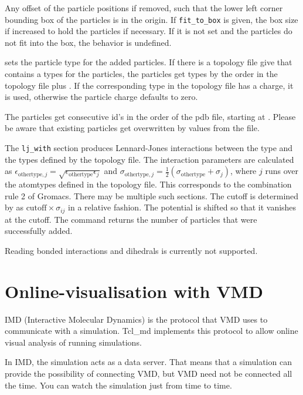 Any offset of the particle positions if removed, such that the lower left
corner bounding box of the particles is in the origin. If \verb|fit_to_box| is
given, the box size if increased to hold the particles if necessary. If it is
not set and the particles do not fit into the box, the behavior is undefined.

 sets the particle type for the added particles. 
If there is a topology file give that contains a types for the particles, 
the particles get types by the order in the topology file plus .
If the corresponding type in the topology file has a charge, it is used,
otherwise the particle charge defaults to zero.

The particles get consecutive id's in the order of the pdb file, starting at
. Please be aware that existing particles get overwritten by
values from the file.

The \verb|lj_with| section produces Lennard-Jones interactions between the
type  and the types defined by the topology file. The
interaction parameters are calculated as $\epsilon_{\text{othertype},j} =
\sqrt{\epsilon_{\text{othertype}} \epsilon_j}$ and $\sigma_{\text{othertype},j}
=\frac{1}{2}\left( \sigma_{\text{othertype}} + \sigma_j \right)$, where $j$
runs over the atomtypes defined in the topology file. This corresponds to the
combination rule 2 of Gromacs. There may be multiple such sections.
The cutoff is determined by  as $\text{cutoff}\times \sigma_{ij}$ in a
relative fashion. The potential is shifted so that it vanishes at the cutoff.
The command returns the number of particles that were successfully added.

Reading bonded interactions and dihedrals is currently not supported.

\section{Online-visualisation with VMD}
\label{sec:IMD}

IMD (Interactive Molecular Dynamics) is the protocol that VMD uses to
communicate with a simulation. Tcl\_md implements this protocol to
allow online visual analysis of running simulations.

In IMD, the simulation acts as a data server. That means that a
simulation can provide the possibility of connecting VMD, but VMD need
not be connected all the time. You can watch the simulation just from
time to time.

